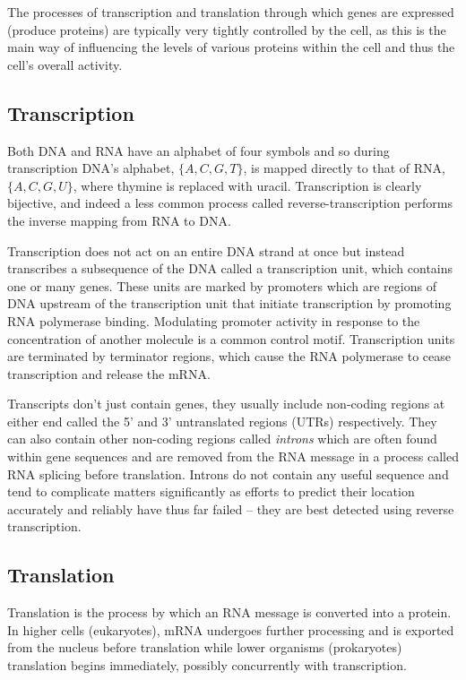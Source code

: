 The processes of transcription and translation through which genes are 
expressed (produce proteins) are typically very tightly
controlled by the cell, as this is the main way of influencing the levels of
various proteins within the cell and thus the cell's overall activity.

\subsection{Transcription}
\label{sec:transcription}

Both DNA and RNA have an alphabet of four symbols and so during transcription
DNA's alphabet, $\{A,C,G,T\}$, is mapped directly to that
of RNA, $\{A,C,G,U\}$, where thymine is replaced with uracil.
Transcription is clearly bijective, and indeed a less common process called
reverse-transcription performs the inverse mapping from RNA to DNA.

Transcription does not act on an entire DNA strand at once but instead
transcribes a subsequence of the DNA called a transcription unit, which
contains one or many genes.
These units are marked by promoters which are regions of DNA upstream
of the transcription unit that initiate transcription by promoting 
RNA polymerase binding.
Modulating promoter activity in response to the concentration of another 
molecule is a common control motif.
Transcription units are terminated by terminator regions, which cause the RNA 
polymerase to cease transcription and release the mRNA.

Transcripts don't just contain genes, they usually include non-coding regions at 
either end called the 5' and 3' untranslated regions (UTRs) respectively.
They can also contain other non-coding regions called \textit{introns}
which are often found within gene sequences and are removed from the RNA message 
in a process called RNA splicing before translation.
Introns do not contain any useful sequence and tend to complicate matters 
significantly as efforts to predict their location accurately and reliably 
have thus far failed -- they are best detected using reverse transcription.

\subsection{Translation}
\label{sec:translation}

Translation is the process by which an RNA message is converted into a protein.
In higher cells (eukaryotes), mRNA undergoes further processing and is exported
from the nucleus before translation while lower organisms (prokaryotes)
translation begins immediately, possibly concurrently with
transcription.

